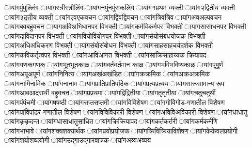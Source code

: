 %
%
%
\छायांग{पुं}{पुल्लिंग}%
\छायांग{स्त्री}{स्त्रीलिंग}%
\छायांग{नपुं}{नपुंसकलिंग}%
\छायांग{१}{प्रथम व्यक्ती}%
\छायांग{२}{द्वितीय व्यक्ती}%
\छायांग{३}{तृतीय व्यक्ती}%
\छायांग{एव}{एकवचन}%
\छायांग{द्विव}{द्विवचन}%
\छायांग{त्रिव}{त्रिव}%
\छायांग{अव}{अल्पवचन}%
\छायांग{बव}{बहुवचन}%
\छायांग{अवि}{अभिधानपर विभक्ती}%
\छायांग{कर्मवि}{कर्मपर विभक्ती}%
\छायांग{सा}{साधनपर विभक्ती}%
\छायांग{दावि}{दानपर विभक्ती}%
\छायांग{वियो}{वियोगपर विभक्ती}%
\छायांग{संयो}{संबंधयोजक विभक्ती}%
\छायांग{अधि}{अधिकरण विभक्ती}%
\छायांग{संबो}{संबोधन विभक्ती}%
\छायांग{साह}{साहचर्यदर्शक विभक्ती}%
\छायांग{कवि}{कर्तृत्वपर विभक्ती}%
\छायांग{आवि}{आगत विभक्ती}%
\छायांग{साक्रि}{साहाय्यक क्रियापद}%
\छायांग{गणक}{गणक}%
\छायांग{भूत}{भूतकाळ}%
\छायांग{वर्त}{वर्तमान काळ}%
\छायांग{भवि}{भविष्यकाळ}%
\छायांग{पू}{पूर्ण}%
\छायांग{अपू}{अपूर्ण}%
\छायांग{नि}{नित्य}%
\छायांग{अखं}{अखंडित}%
\छायांग{क्र}{क्रमिक}%
\छायांग{अक्र}{अक्रमिक}%
% 
% 
\छायांग{नामि}{नामिक}
\छायांग{ना}{नाम}
\छायांग{प्राति}{प्रातिपदिक}
\छायांग{प्रत्य}{प्रत्यय}
\छायांग{सारू}{सामान्य रूप}%
\छायांग{आब}{आदरार्थी बहुवचन}
\छायांग{प्र}{प्रथमा}
\छायांग{द्वि}{द्वितीया}
\छायांग{तृ}{तृतीया}
\छायांग{चतु}{चतुर्थी}
\छायांग{पं}{पंचमी}
\छायांग{ष}{षष्ठी}
\छायांग{सप्त}{सप्तमी}
% 
\छायांग{वि}{विशेषण}
\छायांग{गोवि}{गोड-गणातील विशेषण}
\छायांग{पांवि}{पांढर-गणातील विशेषण}
\छायांग{विवि}{विकारी विशेषण}
\छायांग{अविवि}{अविकारी विशेषण}
% 
% 
\छायांग{धा}{धातु}
\छायांग{कृ}{कृदन्त}
\छायांग{धासा}{धातुसाधित}
\छायांग{क्रि}{क्रियापद}
\छायांग{कर्त}{कर्तरी}
\छायांग{कर्म}{कर्मणि}
\छायांग{भा}{भावे}
\छायांग{शक्य}{शक्यार्थक}
\छायांग{प्रयो}{प्रयोजक}
% 
\छायांग{क्रिवि}{क्रियाविशेषण}
\छायांग{के}{केवलप्रयोगी}
\छायांग{शयो}{शब्दयोगी}
\छायांग{उद्गा}{उद्गारवाचक}
\छायांग{अव्य}{अव्यय}